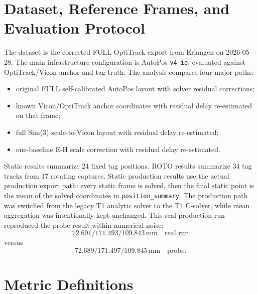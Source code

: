 \documentclass[11pt,a4paper]{article}
\newcommand{\mm}{\,\mathrm{mm}}
\newcommand{\case}[1]{\texttt{#1}}
\begin{document}
\section{Dataset, Reference Frames, and Evaluation Protocol}

The dataset is the corrected FULL OptiTrack export from Erlangen on 2026-05-28.
The main infrastructure configuration is AutoPos \case{v4-io}, evaluated against
OptiTrack/Vicon anchor and tag truth.  The analysis compares four major paths:
\begin{itemize}
    \item original FULL self-calibrated AutoPos layout with solver residual corrections;
    \item known Vicon/OptiTrack anchor coordinates with residual delay re-estimated on that frame;
    \item full Sim(3) scale-to-Vicon layout with residual delay re-estimated;
    \item one-baseline E-H scale correction with residual delay re-estimated.
\end{itemize}

Static results summarize 24 fixed tag positions.  ROTO results summarize 34
tag tracks from 17 rotating captures.  Static production results use the actual
production export path: every static frame is solved, then the final static point
is the mean of the solved coordinates in \case{position\_summary}.  The production
path was switched from the legacy T1 analytic solver to the T4 C-solver, while
mean aggregation was intentionally kept unchanged.  This real production run
reproduced the probe result within numerical noise:
\[
72.691/171.493/109.843\mm \quad \text{real run}
\]
versus
\[
72.689/171.497/109.845\mm \quad \text{probe}.
\]

\section{Metric Definitions}
\end{document}
